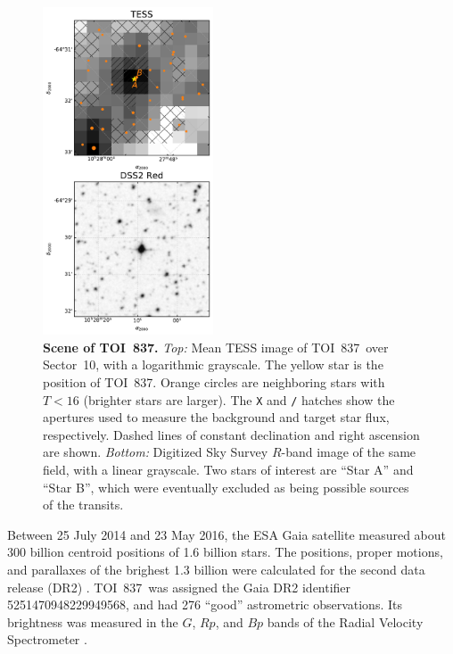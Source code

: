 \documentclass[12pt,twocolumn,tighten]{aastex63}
\newcommand{\tn}{TOI~837} %
\begin{document}
\begin{figure}[!t]
	\begin{center}
		\leavevmode
		\includegraphics[width=0.45\textwidth]{f5.pdf}
	\end{center}
	\vspace{-0.7cm}
	\caption{ {\bf Scene of \tn.}
    {\it Top:} Mean TESS image of \tn\ over Sector~10, with a
    logarithmic grayscale. The yellow star is the position of \tn.
    Orange circles are neighboring stars with $T<16$ (brighter stars
    are larger). The \texttt{X} and \texttt{/} hatches show the
    apertures used to measure the background and target star flux,
    respectively. Dashed lines of constant declination and right
    ascension are shown.  {\it Bottom:} Digitized Sky Survey $R$-band
    image of the same field, with a linear grayscale.  Two stars of
    interest are ``Star A'' and ``Star B'', which were eventually
    excluded as being possible sources of the transits.
		\label{fig:scene}
	}
\end{figure}

Between 25 July 2014 and 23 May 2016, the ESA Gaia satellite measured
about 300 billion centroid positions of 1{.}6 billion stars.  The
positions, proper motions, and parallaxes of the brighest 1{.}3
billion were calculated for the second data release (DR2)
\citep{gaia_collaboration_gaia_2016,lindegren_gaiasoln_2018,gaia_collaboration_gaia_2018}.
\tn\ was assigned the Gaia DR2 identifier 5251470948229949568, and had
276 ``good'' astrometric observations. Its brightness was measured in
the $G$, $Rp$, and $Bp$ bands of the Radial Velocity Spectrometer
\citep{cropper_gaia_2018,evans_gaia_2018}.  
\end{document}
